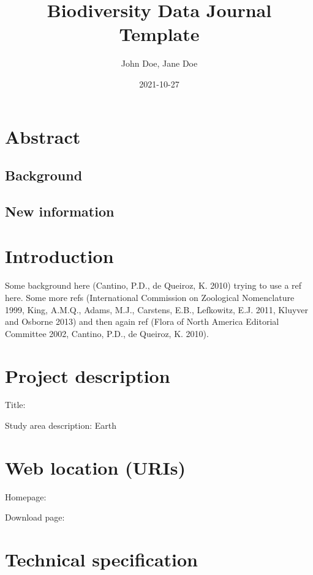 \documentclass[
]{article}
\title{Biodiversity Data Journal Template}
\author{John Doe, Jane Doe}
\date{2021-10-27}
\begin{document}
\maketitle

\hypertarget{abstract}{%
\section{Abstract}\label{abstract}}

\hypertarget{background}{%
\subsection{Background}\label{background}}

\hypertarget{new-information}{%
\subsection{New information}\label{new-information}}

\hypertarget{introduction}{%
\section{Introduction}\label{introduction}}

Some background here (Cantino, P.D., de Queiroz, K. 2010) trying to use
a ref here. Some more refs (International Commission on Zoological
Nomenclature 1999, King, A.M.Q., Adams, M.J., Carstens, E.B., Lefkowitz,
E.J. 2011, Kluyver and Osborne 2013) and then again ref (Flora of North
America Editorial Committee 2002, Cantino, P.D., de Queiroz, K. 2010).

\hypertarget{project-description}{%
\section{Project description}\label{project-description}}

Title:

Study area description: Earth

\hypertarget{web-location-uris}{%
\section{Web location (URIs)}\label{web-location-uris}}

Homepage:

Download page:

\hypertarget{technical-specification}{%
\section{Technical specification}\label{technical-specification}}
\end{document}
